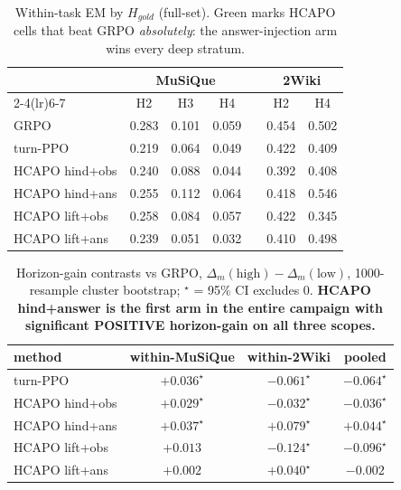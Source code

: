 \documentclass[11pt]{article}
\newcommand{\good}[1]{\textcolor{green!45!black}{#1}}
\begin{document}
\begin{table}[H]\centering\small
\caption{Within-task EM by $H_{gold}$ (full-set). \good{Green} marks HCAPO cells that beat GRPO
\emph{absolutely}: the answer-injection arm wins every deep stratum.}
\begin{tabular}{lccc c cc}
\toprule
& \multicolumn{3}{c}{MuSiQue} && \multicolumn{2}{c}{2Wiki}\\
\cmidrule(lr){2-4}\cmidrule(lr){6-7}
& H2 & H3 & H4 && H2 & H4\\
\midrule
GRPO           & 0.283 & 0.101 & 0.059 && 0.454 & 0.502\\
turn-PPO       & 0.219 & 0.064 & 0.049 && 0.422 & 0.409\\
HCAPO hind+obs & 0.240 & 0.088 & 0.044 && 0.392 & 0.408\\
HCAPO hind+ans & 0.255 & \good{0.112} & \good{0.064} && 0.418 & \good{0.546}\\
HCAPO lift+obs & 0.258 & 0.084 & 0.057 && 0.422 & 0.345\\
HCAPO lift+ans & 0.239 & 0.051 & 0.032 && 0.410 & 0.498\\
\bottomrule
\end{tabular}
\end{table}

\begin{table}[H]\centering\small
\caption{Horizon-gain contrasts vs GRPO, $\Delta_m(\text{high})-\Delta_m(\text{low})$, 1000-resample
cluster bootstrap; $^\star$ = 95\% CI excludes 0. \textbf{HCAPO hind+answer is the first arm in the
entire campaign with significant POSITIVE horizon-gain on all three scopes.}}
\begin{tabular}{lccc}
\toprule
method & within-MuSiQue & within-2Wiki & pooled\\
\midrule
turn-PPO       & $+0.036^\star$ & $-0.061^\star$ & $-0.064^\star$\\
HCAPO hind+obs & $+0.029^\star$ & $-0.032^\star$ & $-0.036^\star$\\
\good{HCAPO hind+ans} & \good{$+0.037^\star$} & \good{$+0.079^\star$} & \good{$+0.044^\star$}\\
HCAPO lift+obs & $+0.013$ & $-0.124^\star$ & $-0.096^\star$\\
HCAPO lift+ans & $+0.002$ & $+0.040^\star$ & $-0.002$\\
\bottomrule
\end{tabular}
\end{table}
\end{document}
